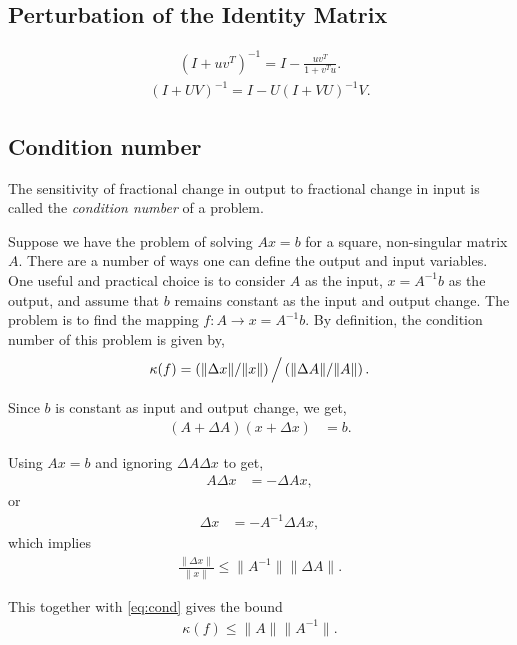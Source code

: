 \documentclass{amsart}
\theoremstyle{plain}
\numberwithin{equation}{section}
\begin{document}
\subsection*{Perturbation of the Identity Matrix}
\begin{align*}
\left(I + uv^T\right)^{-1} = I - \frac{uv^T}{1 + v^Tu}.
\end{align*}
\begin{align*}
\left(I + UV\right)^{-1} = I - U(I+VU)^{-1}V.
\end{align*}


\subsection*{Condition number}
The sensitivity of fractional change in output
to fractional change in input is called the \emph{condition number} of 
a problem.

Suppose we have the problem of solving $Ax=b$ for a square, non-singular
matrix $A$. There are a number of
ways one can define the output and input variables. One useful and 
practical choice is to consider $A$ as the input, $x=A^{-1}b$ as the output, and 
assume that $b$ remains constant as the input and output change. 
The problem is to find the mapping $f: A \to x = A^{-1}b$. By definition, the condition
number of this problem is given by,
\begin{align}
\kappa(f) = \left(\|\Delta x\| / \|x\|\right) \Big{/} \left( \| \Delta A\| / \|A\| \right).
\label{eq:cond}
\end{align}

Since $b$ is constant as input and output change, we get,
\begin{align*}
(A+\Delta A) (x + \Delta x) &= b.
\end{align*}

Using $Ax=b$ and ignoring $\Delta A \Delta x$ to get,
\begin{align*}
A \Delta x  &= - \Delta A x,
\end{align*}
or
\begin{align*}
\Delta x &= - A^{-1} \Delta A x,
\end{align*}
which implies
\begin{align*}
\frac{\| \Delta x \|}{\| x \|} \leq \| A^{-1} \| \| \Delta A \| .
\end{align*}

This together with \eqref{eq:cond} gives the bound
\begin{align*}
\kappa(f) \leq \|A\| \|A^{-1}\|.
\end{align*}
\end{document}

